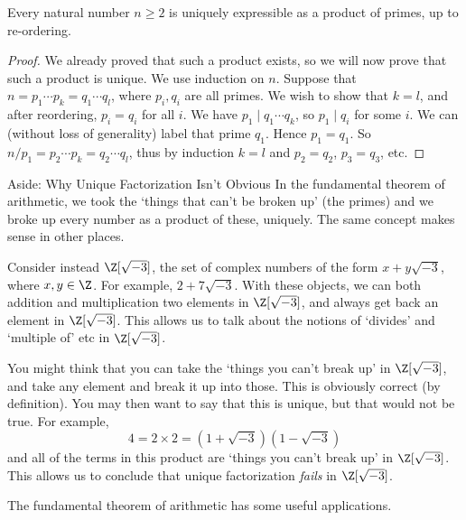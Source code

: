 \documentclass[a4paper]{scrreprt}
\begin{document}
\begin{theorem}
	Every natural number $n \geq 2$ is uniquely expressible as a product of primes, up to re-ordering.
\end{theorem}
\begin{proof}
	We already proved that such a product exists, so we will now prove that such a product is unique. We use induction on $n$.
	Suppose that $n = p_1 \cdots p_k = q_1 \cdots q_l$, where $p_i, q_i$ are all primes. We wish to show that $k = l$, and after reordering, $p_i = q_i$ for all $i$. We have $p_1 \mid q_1 \cdots q_k$, so $p_1 \mid q_i$ for some $i$. We can (without loss of generality) label that prime $q_1$. Hence $p_1 = q_1$. So $n/p_1 = p_2 \cdots p_k = q_2 \cdots q_l$, thus by induction $k = l$ and $p_2 = q_2$, $p_3 = q_3$, etc.
\end{proof}

\begin{aside}{Aside: Why Unique Factorization Isn't Obvious}
	In the fundamental theorem of arithmetic, we took the `things that can't be broken up' (the primes) and we broke up every number as a product of these, uniquely. The same concept makes sense in other places.

Consider instead $\Z[\sqrt{-3}]$, the set of complex numbers of the form $x + y\sqrt{-3}$, where $x, y \in \Z$. For example, $2 + 7\sqrt{-3}$. With these objects, we can both addition and multiplication two elements in $\Z[\sqrt{-3}]$, and always get back an element in $\Z[\sqrt{-3}]$. This allows us to talk about the notions of `divides' and `multiple of' etc in $\Z[\sqrt{-3}]$. 

You might think that you can take the `things you can't break up' in $\Z[\sqrt{-3}]$, and take any element and break it up into those. This is obviously correct (by definition). You may then want to say 
that this is unique, but that would not be true. For example,
$$
4 = 2 \times 2 = (1 + \sqrt{-3})(1 - \sqrt{-3})
$$
and all of the terms in this product are `things you can't break up' in $\Z[\sqrt{-3}]$. This allows us to conclude that unique factorization \emph{fails} in $\Z[\sqrt{-3}]$.

\end{aside}

The fundamental theorem of arithmetic has some useful applications.
\end{document}
